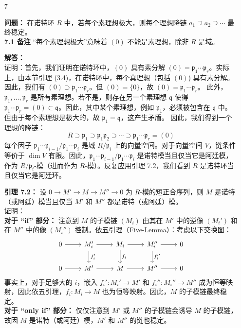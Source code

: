 \documentclass[UTF8]{ctexart}
\begin{document}
\begin{enumerate}
\begin{enumerate}
\item[7]

\textbf{问题：} 在诺特环 \(R\) 中，若每个素理想极大，则每个理想降链 \(a_1 \supseteq a_2 \supseteq \cdots\) 最终稳定。\\
\textbf{7.1 备注} “每个素理想极大”意味着 \((0)\) 不能是素理想，除非 \(R\) 是域。

\textbf{解答：} \\
证明：首先，我们证明在诺特环中，\((0)\) 具有素分解 \((0) = \mathfrak{p}_1 \cdots \mathfrak{p}_r\)。实际上，由本节引理 (3.4)，在诺特环中，每个真理想（包括 \((0)\)) 具有素分解。因此，我们有 \((0) \supset \mathfrak{p}_1 \cdots \mathfrak{p}_r\)。但 \((0) = \{0\}\)，故 \((0) = \mathfrak{p}_1 \cdots \mathfrak{p}_r\)。  
此外，\(\mathfrak{p}_1, \dots, \mathfrak{p}_r\) 是所有素理想。若不是，则存在另一个素理想 \(\mathfrak{q}\) 使得 \(\mathfrak{p}_1 \cdots \mathfrak{p}_r = (0) \subset \mathfrak{q}\)。因此，其中某个素理想，例如 \(\mathfrak{p}_1\)，必须被包含在 \(\mathfrak{q}\) 中。但由于每个素理想是极大的，故 \(\mathfrak{p}_1 = \mathfrak{q}\)，这产生矛盾。  
因此，我们得到一个理想的降链：
\[
R \supset \mathfrak{p}_1 \supset \mathfrak{p}_1 \mathfrak{p}_2 \supset \cdots \supset \mathfrak{p}_1 \cdots \mathfrak{p}_r = (0)
\]
每个因子 \(\mathfrak{p}_1 \cdots \mathfrak{p}_{i-1} / \mathfrak{p}_1 \cdots \mathfrak{p}_i\) 是域 \(R / \mathfrak{p}_i\) 上的向量空间。对于向量空间 \(V\)，链条件等价于 \(\dim V\) 有限。因此，\(\mathfrak{p}_1 \cdots \mathfrak{p}_{i-1} / \mathfrak{p}_1 \cdots \mathfrak{p}_i\) 是诺特模当且仅当它是阿廷模，作为 \(R / \mathfrak{p}_i\)-模（进而作为 \(R\)-模）。反复应用引理 7.2，我们看到 \(R\) 是诺特环当且仅当它是阿廷环。


\textbf{引理 7.2：} 设 \(0 \to M' \to M \to M'' \to 0\) 为 \(R\)-模的短正合序列，则 \(M\) 是诺特（或阿廷）模当且仅当 \(M'\) 和 \(M''\) 都是诺特（或阿廷）模。\\
证明：\\
\textbf{对于 “if” 部分：} 注意到 \(M\) 的子模链 \((M_i)\) 由其在 \(M'\) 中的逆像 \((M_i')\) 和在 \(M''\) 中的像 \((M_i'')\) 控制。依五引理（Five-Lemma）：考虑以下交换图：
\[
\begin{tikzcd}
0 \arrow[r] & M_i' \arrow[r] \arrow[d, "f_i'"] & M_i \arrow[r] \arrow[d, "f_i"] & M_i'' \arrow[r] \arrow[d, "f_i''"] & 0 \\
0 \arrow[r] & M' \arrow[r] & M \arrow[r] & M'' \arrow[r] & 0
\end{tikzcd}
\]
事实上，对于足够大的 \(i\)，嵌入 \(f_i': M_i' \to M'\) 和 \(f_i'': M_i'' \to M''\) 成为恒等映射，因此依五引理，\(f_i: M_i \to M\) 也为恒等映射。因此，\(M\) 的子模链最终稳定。\\
\textbf{对于 “only if” 部分：} 仅仅注意到 \(M'\) 或 \(M''\) 的子模链会诱导 \(M\) 的子模链，故因 \(M\) 是诺特（或阿廷）模，\(M'\) 和 \(M''\) 的链也稳定。



\end{enumerate}
\end{enumerate}
\end{document}
